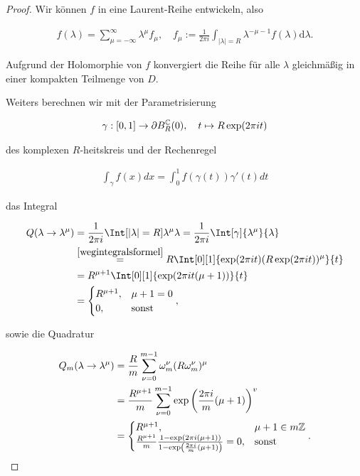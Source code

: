 \begin{proof}

  Wir können $f$ in eine Laurent-Reihe entwickeln, also

  \begin{align*}
    f(\lambda) = \sum_{\mu = - \infty}^{\infty} \lambda^\mu f_\mu, \quad
    f_\mu := \frac{1}{2\pi i}\int_{|\lambda|=R}\lambda^{-\mu - 1}f(\lambda) \mathrm{d}\lambda.
  \end{align*}

  Aufgrund der Holomorphie von $f$ konvergiert die Reihe für alle $\lambda$
  gleichmäßig in einer kompakten Teilmenge von $D$.

  Weiters berechnen wir mit der Parametrisierung

  \begin{align*}
    \gamma: [0,1] \to \partial B_R^{\mathbb{C}}(0), \quad t \mapsto R\exp(2\pi i t)
  \end{align*}

  des komplexen $R$-heitskreis und der Rechenregel

  \begin{align}\label{wegintegralsformel}
    \int_\gamma f(x) dx = \int_0^1 f(\gamma(t))\gamma'(t) dt
  \end{align}

  das Integral

  \begin{align*}
    Q(\lambda \to \lambda^\mu) &= \frac{1}{2 \pi i}\Int[\abs{\lambda} = R]{\lambda^\mu}{\lambda}
    = \frac{1}{2 \pi i}\Int[\gamma]{\lambda^\mu}{\lambda} \\
    &\stackrel{\eqref{wegintegralsformel}}{=} R\Int[0][1]{\exp(2\pi i t)(R \exp(2\pi i t))^\mu}{t} \\
    &= R^{\mu + 1}\Int[0][1]{\exp(2\pi i t(\mu + 1))}{t} \\
    &= \begin{cases}
      R^{\mu + 1}, & \mu + 1 = 0 \\
      0, & \text{sonst}
    \end{cases},
  \end{align*}

  sowie die Quadratur

  \begin{align*}
    Q_m(\lambda \to \lambda^\mu)  &=
    \frac{R}{m} \sum_{\nu = 0}^{m - 1} \omega_m^\nu (R \omega_m^\nu)^\mu \\
    &= \frac{R^{\mu + 1}}{m} \sum_{\nu = 0}^{m - 1}
    \exp\left(\frac{2\pi i}{m}(\mu + 1)\right)^v\\
    &= \begin{cases} R^{\mu + 1}, & \mu + 1 \in m\mathbb{Z} \\
    \frac{R^{\mu + 1}}{m} \frac{1 - \exp\left(2\pi i(\mu + 1)\right)}{1 - \exp\left(\frac{2\pi i}{m}(\mu + 1)\right)} = 0, & \text{sonst}
    \end{cases}.
  \end{align*}


\end{proof}
